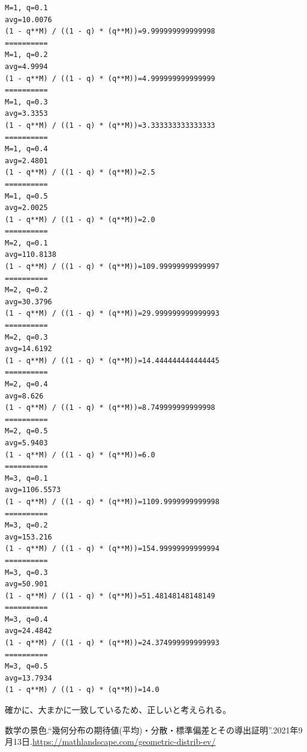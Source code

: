\documentclass[a4paper, 10pt, dvipdfmx]{jlreq}
\begin{document}
\begin{lstlisting}[caption=実験結果, label=code:実験結果]
M=1, q=0.1
avg=10.0076
(1 - q**M) / ((1 - q) * (q**M))=9.999999999999998
==========
M=1, q=0.2
avg=4.9994
(1 - q**M) / ((1 - q) * (q**M))=4.999999999999999
==========
M=1, q=0.3
avg=3.3353
(1 - q**M) / ((1 - q) * (q**M))=3.333333333333333
==========
M=1, q=0.4
avg=2.4801
(1 - q**M) / ((1 - q) * (q**M))=2.5
==========
M=1, q=0.5
avg=2.0025
(1 - q**M) / ((1 - q) * (q**M))=2.0
==========
M=2, q=0.1
avg=110.8138
(1 - q**M) / ((1 - q) * (q**M))=109.99999999999997
==========
M=2, q=0.2
avg=30.3796
(1 - q**M) / ((1 - q) * (q**M))=29.999999999999993
==========
M=2, q=0.3
avg=14.6192
(1 - q**M) / ((1 - q) * (q**M))=14.444444444444445
==========
M=2, q=0.4
avg=8.626
(1 - q**M) / ((1 - q) * (q**M))=8.749999999999998
==========
M=2, q=0.5
avg=5.9403
(1 - q**M) / ((1 - q) * (q**M))=6.0
==========
M=3, q=0.1
avg=1106.5573
(1 - q**M) / ((1 - q) * (q**M))=1109.9999999999998
==========
M=3, q=0.2
avg=153.216
(1 - q**M) / ((1 - q) * (q**M))=154.99999999999994
==========
M=3, q=0.3
avg=50.901
(1 - q**M) / ((1 - q) * (q**M))=51.48148148148149
==========
M=3, q=0.4
avg=24.4842
(1 - q**M) / ((1 - q) * (q**M))=24.374999999999993
==========
M=3, q=0.5
avg=13.7934
(1 - q**M) / ((1 - q) * (q**M))=14.0
\end{lstlisting}

確かに、大まかに一致しているため、正しいと考えられる。

\begin{thebibliography}{9}
  数学の景色.``幾何分布の期待値(平均)・分散・標準偏差とその導出証明''.2021年9月13日.\url{https://mathlandscape.com/geometric-distrib-ev/}
\end{thebibliography}
\end{document}
